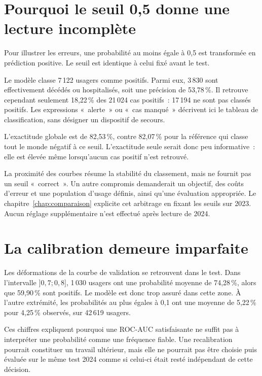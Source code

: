 \section{Pourquoi le seuil 0,5 donne une lecture incomplète}
Pour illustrer les erreurs, une probabilité au moins égale à 0,5 est transformée
en prédiction positive. Le seuil est identique à celui fixé avant le test.


Le modèle classe 7\,122 usagers comme positifs. Parmi eux, 3\,830 sont effectivement
décédés ou hospitalisés, soit une précision de 53,78\,\%. Il retrouve cependant
seulement 18,22\,\% des 21\,024 cas positifs~: 17\,194 ne sont pas classés positifs.
Les expressions «~alerte~» ou «~cas manqué~» décrivent ici le tableau de classification,
sans désigner un dispositif de secours.

L'exactitude globale est de 82,53\,\%, contre 82,07\,\% pour la référence qui classe
tout le monde négatif à ce seuil. L'exactitude seule serait donc peu informative~:
elle est élevée même lorsqu'aucun cas positif n'est retrouvé.

La proximité des courbes résume la stabilité du classement, mais ne fournit pas un
seuil «~correct~». Un autre compromis demanderait un objectif, des coûts d'erreur et
une population d'usage définis, ainsi qu'une évaluation appropriée. Le
chapitre~\ref{chap:comparaison} explicite cet arbitrage en fixant les seuils sur 2023. Aucun réglage
supplémentaire n'est effectué après lecture de 2024.

\section{La calibration demeure imparfaite}
Les déformations de la courbe de validation se retrouvent dans le test. Dans
l'intervalle $]0{,}7;0{,}8]$, 1\,030 usagers ont une probabilité moyenne de 74,28\,\%,
alors que 59,90\,\% sont positifs. Le modèle est donc trop assuré dans cette zone.
À l'autre extrémité, les probabilités au plus égales à 0,1 ont une moyenne de
5,22\,\% pour 4,25\,\% observés, sur 42\,619 usagers.

Ces chiffres expliquent pourquoi une ROC-AUC satisfaisante ne suffit pas à interpréter
une probabilité comme une fréquence fiable. Une recalibration pourrait constituer
un travail ultérieur, mais elle ne pourrait pas être choisie puis évaluée sur le
même test 2024 comme si celui-ci était resté indépendant de cette décision.


